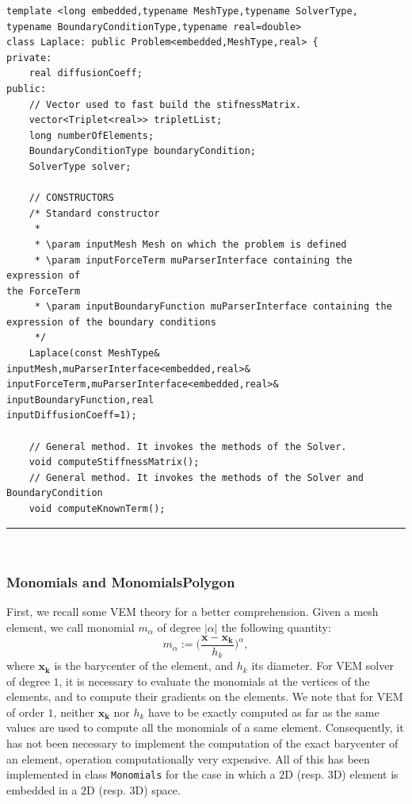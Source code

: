 \begin{lstlisting}[caption=File \texttt{Laplace.h}]
template <long embedded,typename MeshType,typename SolverType,
typename BoundaryConditionType,typename real=double>
class Laplace: public Problem<embedded,MeshType,real> {
private:
    real diffusionCoeff;	
public:
    // Vector used to fast build the stifnessMatrix.
    vector<Triplet<real>> tripletList; 
    long numberOfElements;
    BoundaryConditionType boundaryCondition;
    SolverType solver;

    // CONSTRUCTORS
	/* Standard constructor
	 *
	 * \param inputMesh Mesh on which the problem is defined
	 * \param inputForceTerm muParserInterface containing the expression of 
the ForceTerm
	 * \param inputBoundaryFunction muParserInterface containing the 
expression of the boundary conditions
	 */
    Laplace(const MeshType& inputMesh,muParserInterface<embedded,real>& 
inputForceTerm,muParserInterface<embedded,real>& inputBoundaryFunction,real 
inputDiffusionCoeff=1);

    // General method. It invokes the methods of the Solver.
    void computeStiffnessMatrix();
    // General method. It invokes the methods of the Solver and BoundaryCondition 
    void computeKnownTerm();
\end{lstlisting}
\noindent\rule{16cm}{1pt}\\

\subsubsection{Monomials and MonomialsPolygon}
First, we recall some VEM theory for a better comprehension. Given a mesh element, we call monomial $m_\alpha$ of degree $|\alpha|$ the following quantity:
$$
m_\alpha:=\bigg( \frac{\mathbf{x}-\mathbf{x_k}}{h_k} \bigg) ^\alpha,
$$
where $\mathbf{x_k}$ is the barycenter of the element, and $h_k$ its diameter. For VEM solver of degree $1$, it is necessary to evaluate the monomials at the vertices of the elements, and to compute their gradients on the elements. 
We note that for VEM of order $1$, neither $\mathbf{x_k}$ nor $h_k$ have to be exactly computed as far as the same values are used to compute all the monomials of a same element. Consequently, it has not been necessary to implement the computation of the exact barycenter of an element, operation computationally very expensive. 
All of this has been implemented in class \verb|Monomials| for the case in which a $2$D (resp. $3$D) element is embedded in a $2$D (resp. $3$D) space.

